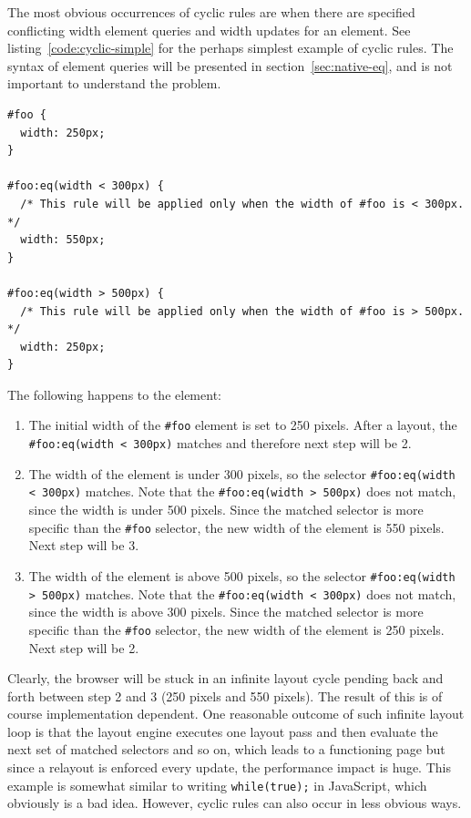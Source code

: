 \documentclass[a4paper,11pt]{kth-mag}
\newcommand{\code}[1]{\texttt{#1}}
\begin{document}
          The most obvious occurrences of cyclic rules are when there are specified conflicting width element queries and width updates for an \gls{element}.
          See listing~\ref{code:cyclic-simple} for the perhaps simplest example of cyclic rules.
          The syntax of element queries will be presented in section~\ref{sec:native-eq}, and is not important to understand the problem.
          \begin{lstlisting}[caption={Simple example of cyclic rules with directly conflicting width element queries and updates.}, captionpos=b, label={code:cyclic-simple}]
#foo {
  width: 250px;
}

#foo:eq(width < 300px) {
  /* This rule will be applied only when the width of #foo is < 300px. */
  width: 550px;
}

#foo:eq(width > 500px) {
  /* This rule will be applied only when the width of #foo is > 500px. */
  width: 250px;
}
          \end{lstlisting}

          The following happens to the \gls{element}:
          \begin{enumerate}
          \item The initial width of the \code{\#foo} \gls{element} is set to 250 pixels.
          After a layout, the \code{\#foo:eq(width < 300px)} matches and therefore next step will be 2.
          \item The width of the \gls{element} is under 300 pixels, so the selector \code{\#foo:eq(width < 300px)} matches.
          Note that the \code{\#foo:eq(width > 500px)} does not match, since the width is under 500 pixels.
          Since the matched selector is more specific than the \code{\#foo} selector, the new width of the \gls{element} is 550 pixels.
          Next step will be 3.
          \item The width of the \gls{element} is above 500 pixels, so the selector \code{\#foo:eq(width > 500px)} matches.
          Note that the \code{\#foo:eq(width < 300px)} does not match, since the width is above 300 pixels.
          Since the matched selector is more specific than the \code{\#foo} selector, the new width of the \gls{element} is 250 pixels.
          Next step will be 2.
          \end{enumerate}
          Clearly, the \gls{browser} will be stuck in an infinite layout cycle pending back and forth between step 2 and 3 (250 pixels and 550 pixels).
          The result of this is of course implementation dependent.
          One reasonable outcome of such infinite layout loop is that the \gls{layout engine} executes one layout pass and then evaluate the next set of matched selectors and so on, which leads to a functioning page but since a relayout is enforced every update, the performance impact is huge.
          This example is somewhat similar to writing \code{while(true);} in \gls{JavaScript}, which obviously is a bad idea.
          However, cyclic rules can also occur in less obvious ways. 
\end{document}
